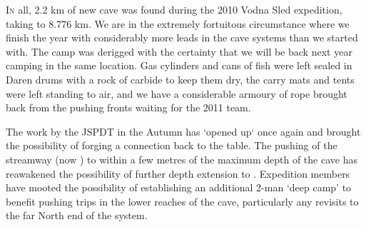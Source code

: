 \thispagestyle{endchapter}

\begin{tcolorbox}
\vspace{80pt}

\lettrine{I}{n} all, 2.2 km of new cave was found during the 2010 Vodna Sled expedition, taking  to 8.776 km. We are in the extremely fortuitous circumstance where we finish the year with considerably more leads in the  cave systems
than we started with. The  camp was derigged with the certainty that we will be back next year camping in the same location. Gas cylinders and cans of fish were left sealed in Daren drums with
a rock of carbide to keep them dry, the carry mats and tents were left standing to air, and we have a considerable armoury of rope brought back from the pushing fronts waiting for the 2011 team.

The work by the JSPDT in the Autumn has ‘opened up‘  once again and brought the possibility of forging a connection back to the table. The pushing of the  streamway (now ) to within
a few metres of the maximum depth of the cave has reawakened the possibility of further depth extension to . Expedition members have mooted the possibility of establishing an additional 2-man
‘deep camp’ to benefit pushing trips in the lower reaches of the cave, particularly any revisits to the far North end of the system.


\end{tcolorbox}
